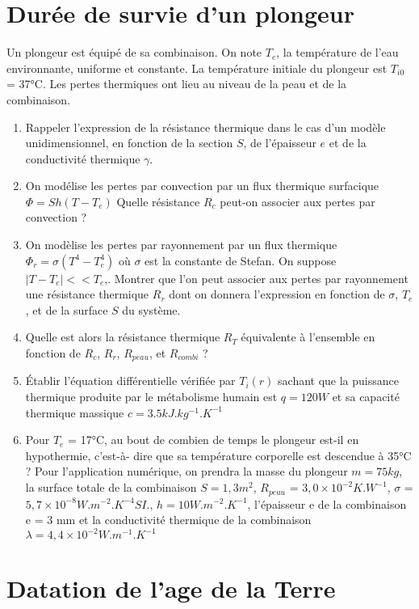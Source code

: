 \documentclass{article}
\begin{document}
\section{Durée de survie d'un plongeur }
Un plongeur est équipé de sa combinaison.
On note $T_e$, la température de l’eau environnante, uniforme et constante. La température initiale du plongeur est $T_{i0}$ = 37°C. Les pertes thermiques ont lieu au niveau de la peau et de la
combinaison. 
\begin{enumerate}
    \item Rappeler l’expression de la résistance thermique dans le cas d’un modèle unidimensionnel,
en fonction de la section $S$, de l’épaisseur $e$ et de la conductivité thermique $\gamma$.
\item On modélise les pertes par convection par un flux thermique surfacique $\Phi = Sh(T-T_e)$
Quelle résistance $R_c$ peut-on associer aux pertes par convection ? 
\item  On modèlise les pertes par rayonnement par un flux thermique  $\Phi_r = \sigma (T^4 - T_e^4)$
où $\sigma$ est la constante de Stefan. On suppose $|T-T_e|<<T_e$,. Montrer que l’on peut associer aux
pertes par rayonnement une résistance thermique $R_r$ dont on donnera l’expression en fonction
de $\sigma$, $T_e$, et de la surface $S$ du système. 
\item  Quelle est alors la résistance thermique $R_T$ équivalente à l’ensemble en fonction de $R_c$, $R_r$, $R_{peau}$, et $R_{combi}$ ?
\item  Établir l’équation différentielle vérifiée par $T_i(r)$ sachant que la puissance thermique produite par le métabolisme humain est $q = 120 W$ et sa capacité thermique massique $c = 3.5 kJ. kg^{-1}.K^{-1}$
\item Pour $T_e$ = 17°C, au bout de combien de temps le plongeur est-il en hypothermie, c’est-à- dire que sa température corporelle est descendue à 35°C ? Pour l’application numérique, on prendra la masse du plongeur $ m = 75 kg$, la surface totale de la combinaison $S = 1,3 m^2$, $R_{peau}$ = $3,0 \times 10^{-2} K.W^{-1}$, $\sigma$ =$5,7 \times 10^{-8} W.m^{-2} . K^{-4} SI.$,  $h = 10  W.m^{-2}.K^{-1}$, l’épaisseur e de la combinaison e = 3 mm et la conductivité thermique de la combinaison $\lambda = 4,4 \times 10^{-2} W.m^{-1}.K^{-1}$



\end{enumerate}

\section{Datation de l'age de la Terre}
\end{document}
